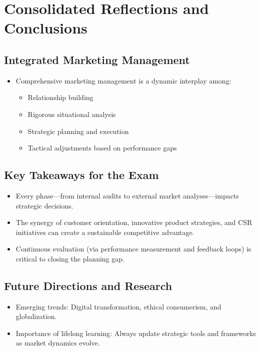 \documentclass[12pt,a4paper]{report}
\begin{document}
\chapter{Consolidated Reflections and Conclusions}

\section{Integrated Marketing Management}
\begin{itemize}
    \item Comprehensive marketing management is a dynamic interplay among:
    \begin{itemize}
         \item Relationship building
         \item Rigorous situational analysis
         \item Strategic planning and execution
         \item Tactical adjustments based on performance gaps
    \end{itemize}
\end{itemize}

\section{Key Takeaways for the Exam}
\begin{itemize}
    \item Every phase—from internal audits to external market analyses—impacts strategic decisions.
    \item The synergy of customer orientation, innovative product strategies, and CSR initiatives can create a sustainable competitive advantage.
    \item Continuous evaluation (via performance measurement and feedback loops) is critical to closing the planning gap.
\end{itemize}

\section{Future Directions and Research}
\begin{itemize}
    \item Emerging trends: Digital transformation, ethical consumerism, and globalization.
    \item Importance of lifelong learning: Always update strategic tools and frameworks as market dynamics evolve.
\end{itemize}
\end{document}
